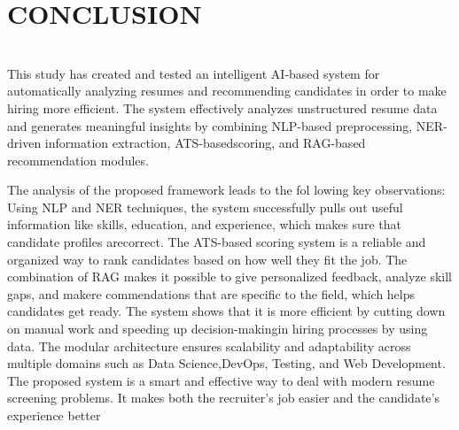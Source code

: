 \chapter{CONCLUSION}
\patchcmd{\chapter}{\thispagestyle{fancy}}{}{}
  \hrulefill\\
  \thispagestyle{empty}
This study has created and tested an intelligent AI-based system for  automatically analyzing resumes and recommending candidates in order to make hiring more efficient. The system effectively analyzes unstructured resume data and generates meaningful insights by combining NLP-based preprocessing, NER-driven information extraction, ATS-basedscoring, and RAG-based recommendation modules.

\vspace{6pt}
\noindent The analysis of the proposed framework leads to the fol
lowing key observations:
    Using NLP and NER techniques, the system successfully pulls out useful information like skills, education, and experience, which makes sure that candidate profiles arecorrect.
    The ATS-based scoring system is a reliable and organized way to rank candidates based on how well they fit the job.
    The combination of RAG makes it possible to give personalized feedback, analyze skill gaps, and makere commendations that are specific to the field, which helps candidates get ready.
     The system shows that it is more efficient by cutting down on manual work and speeding up decision-makingin hiring processes by using data.
     The modular architecture ensures scalability and adaptability across multiple domains such as Data Science,DevOps, Testing, and Web Development.
\vspace{6pt}
\noindent The proposed system is a smart and effective way to deal with modern resume screening problems. It makes both the recruiter’s job easier and the candidate’s experience better